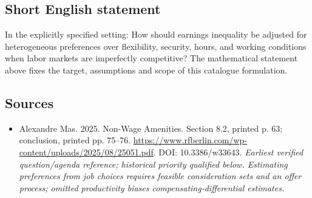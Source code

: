 \documentclass[11pt]{article}
\begin{document}
\subsection{Short English statement}
In the explicitly specified setting: How should earnings inequality be adjusted for heterogeneous preferences over flexibility, security, hours, and working conditions when labor markets are imperfectly competitive? The mathematical statement above fixes the target, assumptions and scope of this catalogue formulation.

\subsection{Sources}
\begin{itemize}\raggedright
\item[\textnormal{[S1]}]\hypertarget{source:30007637:1}{} Alexandre Mas. 2025. Non-Wage Amenities. Section 8.2, printed p. 63; conclusion, printed pp. 75–76.
\url{https://www.rfberlin.com/wp-content/uploads/2025/08/25051.pdf}.
DOI: 10.3386/w33643.
{\small\textit{Earliest verified question/agenda reference; historical priority qualified below. Estimating preferences from job choices requires feasible consideration sets and an offer process; omitted productivity biases compensating-differential estimates.}}
\end{itemize}
\end{document}
